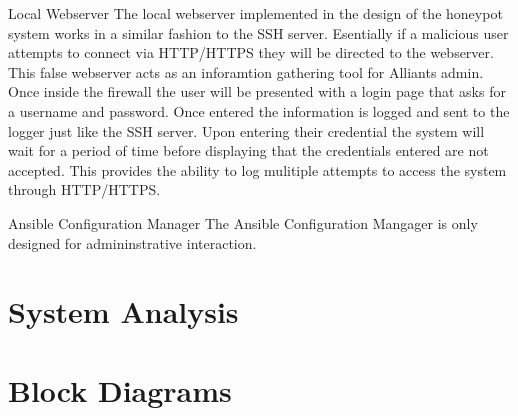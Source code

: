 Local Webserver
The local webserver implemented in the design of the honeypot system works in a similar fashion to the SSH server. Esentially if a malicious user attempts to connect via HTTP/HTTPS they will be directed to the webserver.  This false webserver acts as an inforamtion gathering tool for Alliants admin.  Once inside the firewall the user will be presented with a login page that asks for a username and password.  Once entered the information is logged and sent to the logger just like the SSH server.  Upon entering their credential the system will wait for a period of time before displaying that the credentials entered are not accepted.  This provides the ability to log mulitiple attempts to access the system through HTTP/HTTPS.

Ansible Configuration Manager
The Ansible Configuration Mangager is only designed for admininstrative interaction.  

\section{System Analysis}

\Blindtext

\section{Block Diagrams}

\Blindtext
